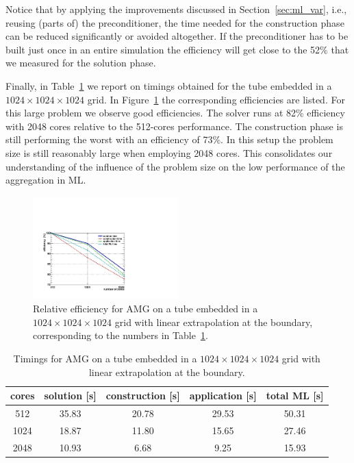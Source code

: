 \documentclass[a4paper,10pt,3p,final,pdftex]{elsarticle}
\begin{document}
Notice that by applying the improvements discussed in
Section~\ref{sec:ml_var}, i.e., reusing (parts of) the preconditioner,
the time needed for the construction phase can be reduced significantly
or avoided altogether.  If the preconditioner has to be built just once
in an entire simulation the efficiency will get close to the 52\% that
we measured for the solution phase.  

Finally, in Table~\ref{tbl:timings_solver_1024} we report on timings
obtained for the tube embedded in a $1024\times1024\times1024$ grid.  In
Figure~\ref{fig:speedup_1024} the corresponding efficiencies are listed.
For this large problem we observe good efficiencies.  The solver runs at
82\% efficiency with 2048 cores relative to the 512-cores performance.
The construction phase is still performing the worst with an efficiency
of 73\%.  In this setup the problem size is still reasonably large when
employing 2048 cores.  This consolidates our understanding of the
influence of the problem size on the low performance of the aggregation
in ML.
\begin{figure}[htb]
    \begin{center}
        \includegraphics[width=0.5\textwidth]{eff_1024_lin.pdf}
        \caption{Relative efficiency for AMG on a tube embedded in a
            $1024\times1024\times1024$ grid with linear extrapolation at the
            boundary, corresponding to the numbers in
            Table~\ref{tbl:timings_solver_1024}.}
        \label{fig:speedup_1024}
    \end{center}
\end{figure}
\begin{table}[htb]
  \begin{center}
    \begin{tabular}{ccccc}
      \hline
      cores & solution [s] & construction [s] & application [s] & total ML [s] \\
      \hline
      512  &  35.83 &  20.78 &  29.53 &  50.31  \\
      1024 &  18.87 &  11.80 &  15.65 &  27.46  \\
      2048 &  10.93 &  6.68 &  9.25 &  15.93   \\
      \hline
    \end{tabular}
    \caption{Timings for AMG on a tube embedded in a
      $1024\times1024\times1024$ grid with linear extrapolation at the
      boundary.}
    \label{tbl:timings_solver_1024}
  \end{center}
\end{table}
\end{document}
